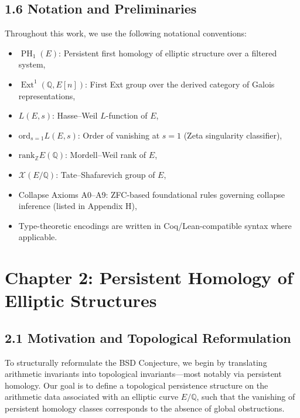 \documentclass[11pt]{article}
\DeclareMathOperator{\Ext}{Ext}
\DeclareMathOperator{\PH}{PH}
\newcommand{\QQ}{\mathbb{Q}}
\newcommand{\ZZ}{\mathbb{Z}}
\newcommand{\Sha}{\mathcal{X}}
\begin{document}
\subsection{1.6 Notation and Preliminaries}

Throughout this work, we use the following notational conventions:

\begin{itemize}
  \item $\PH_1(E)$: Persistent first homology of elliptic structure over a filtered system,
  \item $\Ext^1(\QQ,E[n])$: First Ext group over the derived category of Galois representations,
  \item $L(E,s)$: Hasse–Weil $L$-function of $E$,
  \item $\mathrm{ord}_{s=1} L(E,s)$: Order of vanishing at $s=1$ (Zeta singularity classifier),
  \item $\mathrm{rank}_{\ZZ} E(\QQ)$: Mordell–Weil rank of $E$,
  \item $\Sha(E/\QQ)$: Tate–Shafarevich group of $E$,
  \item Collapse Axioms A0–A9: ZFC-based foundational rules governing collapse inference (listed in Appendix H),
  \item Type-theoretic encodings are written in Coq/Lean-compatible syntax where applicable.
\end{itemize}




\section{Chapter 2: Persistent Homology of Elliptic Structures}

\subsection{2.1 Motivation and Topological Reformulation}

To structurally reformulate the BSD Conjecture, we begin by translating arithmetic invariants into topological invariants—most notably via persistent homology.  
Our goal is to define a topological persistence structure on the arithmetic data associated with an elliptic curve \( E/\QQ \), such that the vanishing of persistent homology classes corresponds to the absence of global obstructions.
\end{document}
